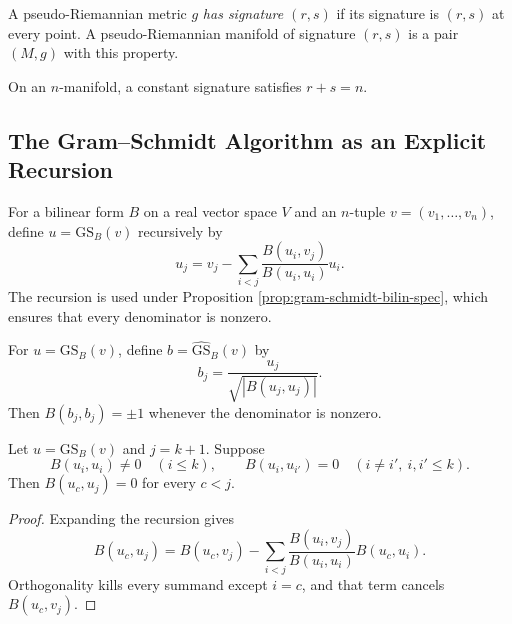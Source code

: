 \begin{definition}
\label{def:pseudo-metric-has-signature}
\leanok
{}
A pseudo-Riemannian metric $g$ \emph{has signature $(r,s)$} if its signature is
$(r,s)$ at every point. A pseudo-Riemannian manifold of signature $(r,s)$ is a
pair $(M,g)$ with this property.
\end{definition}

On an $n$-manifold, a constant signature satisfies $r+s=n$.

\subsection{The Gram--Schmidt Algorithm as an Explicit Recursion}

\begin{definition}
\label{def:gram-schmidt-bilin}
\leanok
For a bilinear form $B$ on a real vector space $V$ and an $n$-tuple
$v=(v_1,\ldots,v_n)$, define $u=\mathrm{GS}_B(v)$ recursively by
\[
u_j=v_j-\sum_{i<j}\frac{B(u_i,v_j)}{B(u_i,u_i)}u_i.
\]
The recursion is used under Proposition \ref{prop:gram-schmidt-bilin-spec}, which
ensures that every denominator is nonzero.
\end{definition}

\begin{definition}
\label{def:gram-schmidt-bilin-normed}
\leanok
{}
For $u=\mathrm{GS}_B(v)$, define $b=\widehat{\mathrm{GS}}_B(v)$ by
\[
b_j=\frac{u_j}{\sqrt{|B(u_j,u_j)|}}.
\]
Then $B(b_j,b_j)=\pm1$ whenever the denominator is nonzero.
\end{definition}

\begin{lemma}
\label{lem:gram-schmidt-bilin-orthogonal-earlier}
\leanok
{}
Let $u=\mathrm{GS}_B(v)$ and $j=k+1$. Suppose
\[
B(u_i,u_i)\ne0\quad(i\leq k),
\qquad B(u_i,u_{i'})=0\quad(i\ne i',\ i,i'\leq k).
\]
Then $B(u_c,u_j)=0$ for every $c<j$.
\end{lemma}

\begin{proof}
\leanok
{}
\sketch Expanding the recursion gives
\[
B(u_c,u_j)=B(u_c,v_j)-\sum_{i<j}
\frac{B(u_i,v_j)}{B(u_i,u_i)}B(u_c,u_i).
\]
Orthogonality kills every summand except $i=c$, and that term cancels
$B(u_c,v_j)$.
\end{proof}

